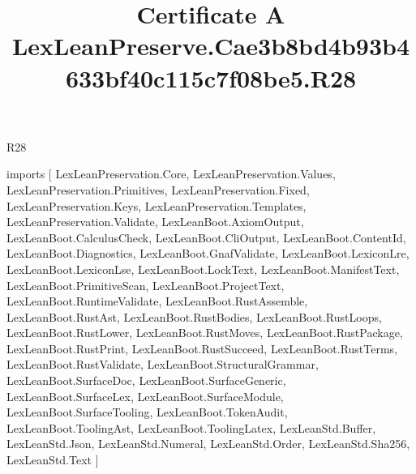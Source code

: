 \begin{lexlean}{R28}
\title{Certificate A LexLeanPreserve.Cae3b8bd4b93b4633bf40c115c7f08be5.R28}
\begin{coremodule}
imports [
  LexLeanPreservation.Core,
  LexLeanPreservation.Values,
  LexLeanPreservation.Primitives,
  LexLeanPreservation.Fixed,
  LexLeanPreservation.Keys,
  LexLeanPreservation.Templates,
  LexLeanPreservation.Validate,
  LexLeanBoot.AxiomOutput,
  LexLeanBoot.CalculusCheck,
  LexLeanBoot.CliOutput,
  LexLeanBoot.ContentId,
  LexLeanBoot.Diagnostics,
  LexLeanBoot.GnafValidate,
  LexLeanBoot.LexiconLre,
  LexLeanBoot.LexiconLse,
  LexLeanBoot.LockText,
  LexLeanBoot.ManifestText,
  LexLeanBoot.PrimitiveScan,
  LexLeanBoot.ProjectText,
  LexLeanBoot.RuntimeValidate,
  LexLeanBoot.RustAssemble,
  LexLeanBoot.RustAst,
  LexLeanBoot.RustBodies,
  LexLeanBoot.RustLoops,
  LexLeanBoot.RustLower,
  LexLeanBoot.RustMoves,
  LexLeanBoot.RustPackage,
  LexLeanBoot.RustPrint,
  LexLeanBoot.RustSucceed,
  LexLeanBoot.RustTerms,
  LexLeanBoot.RustValidate,
  LexLeanBoot.StructuralGrammar,
  LexLeanBoot.SurfaceDoc,
  LexLeanBoot.SurfaceGeneric,
  LexLeanBoot.SurfaceLex,
  LexLeanBoot.SurfaceModule,
  LexLeanBoot.SurfaceTooling,
  LexLeanBoot.TokenAudit,
  LexLeanBoot.ToolingAst,
  LexLeanBoot.ToolingLatex,
  LexLeanStd.Buffer,
  LexLeanStd.Json,
  LexLeanStd.Numeral,
  LexLeanStd.Order,
  LexLeanStd.Sha256,
  LexLeanStd.Text
]


\end{coremodule}
\end{lexlean}
